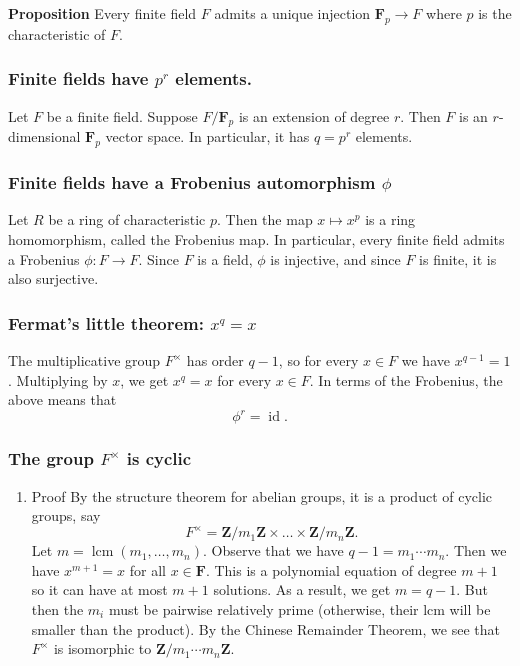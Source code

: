 \documentclass[11pt]{article}
\begin{document}
\textbf{\textbf{Proposition}} Every finite field \(F\) admits a unique injection \(\mathbf{F}_p \to F\) where \(p\) is the characteristic of \(F\).
\subsubsection{Finite fields have \(p^r\) elements.}
\label{sec:org8b667fc}
Let \(F\) be a finite field.
Suppose \(F / \mathbf{F}_p\) is an extension of degree \(r\).
Then \(F\) is an \(r\)-dimensional \(\mathbf{F}_p\) vector space.
In particular, it has \(q = p^r\) elements.
\subsubsection{Finite fields have a Frobenius automorphism \(\phi\)}
\label{sec:org431d17d}
Let \(R\) be a ring of characteristic \(p\).
Then the map \(x \mapsto x^p\) is a ring homomorphism, called the Frobenius map.
In particular, every finite field admits a Frobenius \(\phi \colon F \to F\).
Since \(F\) is a field, \(\phi\) is injective, and since \(F\) is finite, it is also surjective.
\subsubsection{Fermat's little theorem: \(x^q = x\)}
\label{sec:org6bd971e}
The multiplicative group \(F^{\times}\) has order \(q-1\), so for every \(x \in F\) we have \(x^{q-1} = 1\).
Multiplying by \(x\), we get \(x^q = x\) for every \(x \in F\).
In terms of the Frobenius, the above means that 
\[ \phi^r = \operatorname{id}.\]
\subsubsection{The group \(F^{\times}\) is cyclic}
\label{sec:org7f57740}
\begin{enumerate}
\item Proof
\label{sec:org97e1a29}
By the structure theorem for abelian groups, it is a product of cyclic groups, say
\[ F^{\times} = \mathbf{Z}/m_1 \mathbf{Z} \times \dots \times \mathbf{Z}/ m_n \mathbf{Z}.\]
Let \(m = \operatorname{lcm}(m_1, \dots, m_n)\).
Observe that we have \(q - 1 = m_1 \cdots m_{n}.\)
Then we have \(x^{m+1} = x\) for all \(x \in \mathbf{F}\).
This is a polynomial equation of degree \(m+1\) so it can have at most \(m+1\) solutions.
As a result, we get \(m = q-1\).
But then the \(m_i\) must be pairwise relatively prime (otherwise, their lcm will be smaller than the product).
By the Chinese Remainder Theorem, we see that \(F^{\times}\) is isomorphic to \(\mathbf{Z} / m_1\cdots m_n \mathbf{Z}\).
\end{enumerate}
\end{document}
